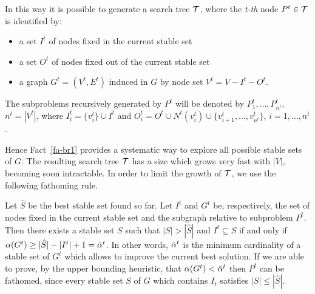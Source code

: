  In this way it is possible to generate a search tree $\cal T$,
where the {\it t-th} node $P^t \in {\cal T}$ is identified  by:
\begin{itemize}
\item a set $I^t$ of nodes fixed in the current stable set  
\item a set $O^t$ of nodes fixed  out of the current stable set
\item a graph $G^t=(V^t,E^t)$ induced in $G$ by node set
$V^t=V-I^t-O^t$.
\end{itemize} 
 The  subproblems recursively generated by $P^t$
will be denoted by $P^t_1,\dots, P^t_{n^t}$, $n^t = |V^t|$, where
$I^t_i = \{v^t_i\} \cup I^t$ and $O^t_i = O^t \cup N^t(v^t_i) \cup
\{v^t_{i+1},\dots ,v^t_{n^t}\}$, $i=1,\dots,n^t$. 
  
 Hence Fact~\ref{fa-br1} provides a systematic way to explore all
possible stable sets of $G$. The resulting search tree $\cal T$ has a
size which grows very fast with $|V|$, becoming soon intractable. In
order to limit the growth of $\cal T$, we use the following
fathoming rule.

Let $\hat S$ be the best stable set found so far. Let
$I^t$  and $G^t$ be, respectively, the set of nodes fixed in the
current stable set and the subgraph relative to subproblem $P^t$.
Then there exists a stable set $S$ such that $|S| > |\hat S|$ and
$I^t \subseteq S$ if and only if $\alpha(G^t) \geq |\hat S| - |I^t|
+ 1 = {\bar \alpha}^t$. In other words, ${\bar \alpha}^t$ is the minimum cardinality
of a stable set of $G^t$ which allows to improve the current best
solution. If we are able to prove, by the upper bounding heuristic,
that  $\alpha(G^t)<{\bar \alpha}^t$  then $P^t$ can be fathomed, since
every stable set $S$ of $G$ which contains $I_t$ satisfies $|S|
\leq |\hat S|$.  

